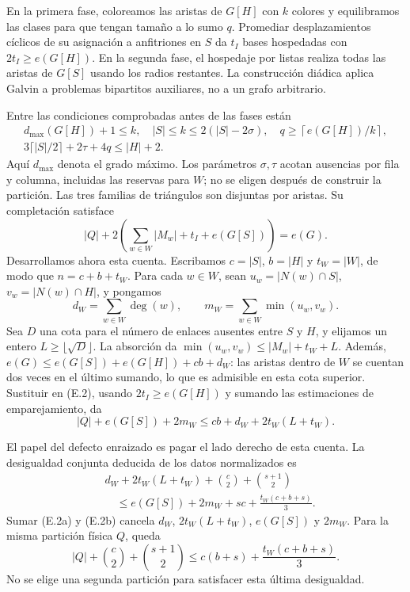 \documentclass[spanish,11pt,a4paper]{article}
\begin{document}
En la primera fase, coloreamos las aristas de \(G[H]\) con \(k\) colores y equilibramos las clases para que tengan tamaño a lo sumo \(q\). Promediar desplazamientos cíclicos de su asignación a anfitriones en \(S\) da \(t_I\) bases hospedadas con \(2t_I\ge e(G[H])\). En la segunda fase, el hospedaje por listas realiza todas las aristas de \(G[S]\) usando los radios restantes. La construcción diádica aplica Galvin a problemas bipartitos auxiliares, no a un grafo arbitrario.

Entre las condiciones comprobadas antes de las fases están \[
\begin{gathered}
d_{\max}(G[H])+1\le k,\quad |S|\le k\le2(|S|-2\sigma),\quad
q\ge\left\lceil e(G[H])/k\right\rceil,\\
3\lceil|S|/2\rceil+2\tau+4q\le |H|+2.
\end{gathered}
\tag{E.1}
\] Aquí \(d_{\max}\) denota el grado máximo. Los parámetros \(\sigma,\tau\) acotan ausencias por fila y columna, incluidas las reservas para \(W\); no se eligen después de construir la partición. Las tres familias de triángulos son disjuntas por aristas. Su completación satisface \[
|Q|+2\left(\sum_{w\in W}|M_w|+t_I+e(G[S])\right)=e(G).
\tag{E.2}
\] Desarrollamos ahora esta cuenta. Escribamos \(c=|S|\), \(b=|H|\) y \(t_W=|W|\), de modo que \(n=c+b+t_W\). Para cada \(w\in W\), sean \(u_w=|N(w)\cap S|\), \(v_w=|N(w)\cap H|\), y pongamos \[
d_W=\sum_{w\in W}\deg(w),\qquad
m_W=\sum_{w\in W}\min(u_w,v_w).
\] Sea \(D\) una cota para el número de enlaces ausentes entre \(S\) y \(H\), y elijamos un entero \(L\ge\lfloor\sqrt D\rfloor\). La absorción da \(\min(u_w,v_w)\le |M_w|+t_W+L\). Además, \(e(G)\le e(G[S])+e(G[H])+cb+d_W\): las aristas dentro de \(W\) se cuentan dos veces en el último sumando, lo que es admisible en esta cota superior. Sustituir en (E.2), usando \(2t_I\ge e(G[H])\) y sumando las estimaciones de emparejamiento, da \[
|Q|+e(G[S])+2m_W\le cb+d_W+2t_W(L+t_W).
\tag{E.2a}
\]

El papel del defecto enraizado es pagar el lado derecho de esta cuenta. La desigualdad conjunta deducida de los datos normalizados es \[
\begin{split}
&d_W+2t_W(L+t_W)+\binom c2+\binom{s+1}2\\
&\hspace{1em}\le e(G[S])+2m_W+sc+\frac{t_W(c+b+s)}3.
\end{split}
\tag{E.2b}
\] Sumar (E.2a) y (E.2b) cancela \(d_W\), \(2t_W(L+t_W)\), \(e(G[S])\) y \(2m_W\). Para la misma partición física \(Q\), queda \[
|Q|+\binom c2+\binom{s+1}2
\le c(b+s)+\frac{t_W(c+b+s)}3.
\tag{E.2c}
\] No se elige una segunda partición para satisfacer esta última desigualdad.
\end{document}
